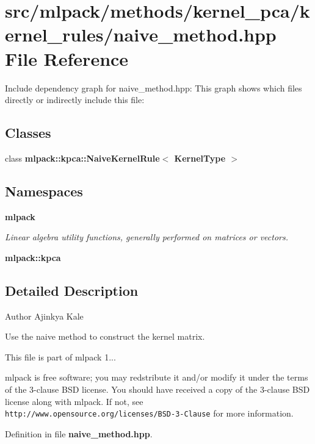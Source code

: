\section{src/mlpack/methods/kernel\-\_\-pca/kernel\-\_\-rules/naive\-\_\-method.hpp File Reference}
\label{naive__method_8hpp}
Include dependency graph for naive\-\_\-method.\-hpp\-:
This graph shows which files directly or indirectly include this file\-:
\subsection*{Classes}
\begin{DoxyCompactItemize}
\item 
class {\bf mlpack\-::kpca\-::\-Naive\-Kernel\-Rule$<$ Kernel\-Type $>$}
\end{DoxyCompactItemize}
\subsection*{Namespaces}
\begin{DoxyCompactItemize}
\item 
{\bf mlpack}
\begin{DoxyCompactList}\small\item\em Linear algebra utility functions, generally performed on matrices or vectors. \end{DoxyCompactList}\item 
{\bf mlpack\-::kpca}
\end{DoxyCompactItemize}


\subsection{Detailed Description}
\begin{DoxyAuthor}{Author}
Ajinkya Kale
\end{DoxyAuthor}
Use the naive method to construct the kernel matrix.

This file is part of mlpack 1...

mlpack is free software; you may redstribute it and/or modify it under the terms of the 3-\/clause B\-S\-D license. You should have received a copy of the 3-\/clause B\-S\-D license along with mlpack. If not, see {\tt http\-://www.\-opensource.\-org/licenses/\-B\-S\-D-\/3-\/\-Clause} for more information. 

Definition in file {\bf naive\-\_\-method.\-hpp}.

